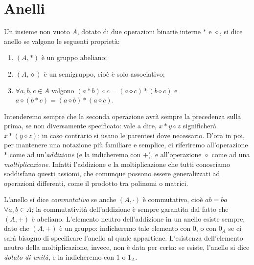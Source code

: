 \section{Anelli} \label{sec:anelli}
\begin{definizione} \label{d:anello}
Un insieme non vuoto $A$, dotato di due operazioni binarie interne $*$ e $\diamond$, si dice anello se valgono le seguenti proprietà:
\begin{enumerate}
\item $(A,*)$ è un gruppo abeliano;
\item $(A,\diamond)$ è un semigruppo, cioè è solo associativo;
\item $\forall a,b,c\in A$ valgono $(a* b)\diamond c=(a\diamond c)*(b\diamond c)$ e $a\diamond(b* c)=(a\diamond b)*(a\diamond c)$.
\end{enumerate}
\end{definizione}
Intenderemo sempre che la seconda operazione avrà sempre la precedenza sulla prima, se non diversamente specificato: vale a dire, $x* y\diamond z$ significherà $x*(y\diamond z)$; in caso contrario si usano le parentesi dove necessario.
D'ora in poi, per mantenere una notazione più familiare e semplice, ci riferiremo all'operazione $*$ come ad un'\emph{addizione} (e la indicheremo con $+$), e all'operazione $\diamond$ come ad una \emph{moltiplicazione}.
Infatti l'addizione e la moltiplicazione che tutti conosciamo soddisfano questi assiomi, che comunque possono essere generalizzati ad operazioni differenti, come il prodotto tra polinomi o matrici.

L'anello si dice \emph{commutativo} se anche $(A,\cdot)$ è commutativo, cioè $ab=ba$ $\forall a,b\in A$; la commutatività dell'addizione è sempre garantita dal fatto che $(A,+)$ è abeliano.
L'elemento neutro dell'addizione in un anello esiste sempre, dato che $(A,+)$ è un gruppo: indicheremo tale elemento con $0$, o con $0_A$ se ci sarà bisogno di specificare l'anello al quale appartiene.
L'esistenza dell'elemento neutro della moltiplicazione, invece, non è data per certa: se esiste, l'anello si dice \emph{dotato di unità}, e la indicheremo con $1$ o $1_A$.

